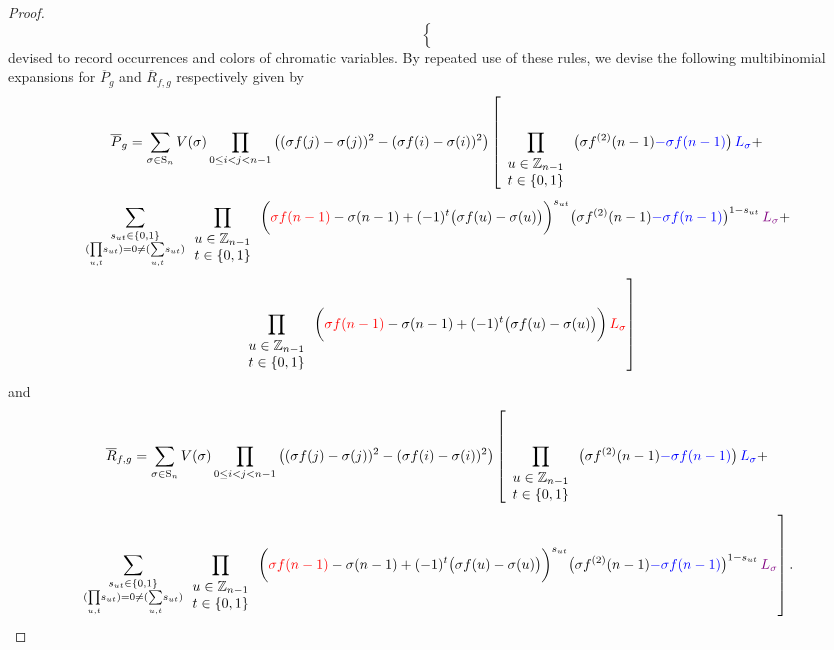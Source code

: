 \begin{proof}
\[\begin{cases}
\begin{array}{ccc}
\end{array}\end{cases}
\]
devised to record occurrences and colors of chromatic variables. By repeated use of these rules, we devise the following multibinomial expansions for $\overline{P}_{g}$ and $\overline{R}_{f,g}$ respectively given by
\[
\overline{P}_{g}=\sum_{\sigma\in\text{S}_{n}}V(\sigma)\prod_{0\le i<j<n-1}\big((\sigma f(j)-\sigma(j))^{2}-(\sigma f(i)-\sigma(i))^{2}\big)\left[\prod_{\begin{array}{c}
u\in\mathbb{Z}_{n-1}\\
t\in\{0,1\}
\end{array}}\big(\sigma f^{(2)}(n-1){\color{blue}-\sigma f(n-1)}\big)\,{\color{blue}L_{\sigma}}+\right.
\]
\[
\sum_{\substack{s_{ut}\in\{0,1\}\\
(\underset{u,t}{\prod}s_{ut})=0\ne(\underset{u,t}{\sum}s_{ut})
}
}\prod_{\begin{array}{c}
u\in\mathbb{Z}_{n-1}\\
t\in\{0,1\}
\end{array}}\bigg({\color{red}\sigma f(n-1)}-\sigma(n-1)+(-1)^{t}\big(\sigma f(u)-\sigma(u)\big)\bigg)^{s_{ut}}\big(\sigma f^{(2)}(n-1){\color{blue}-\sigma f(n-1)}\big)^{1-s_{ut}}\,{\color{violet}L_{\sigma}}+
\]
\[
\left.\prod_{\begin{array}{c}
u\in\mathbb{Z}_{n-1}\\
t\in\{0,1\}
\end{array}}\bigg({\color{red}\sigma f(n-1)}-\sigma(n-1)+(-1)^{t}\big(\sigma f(u)-\sigma(u)\big)\bigg)\,{\color{red}L_{\sigma}}\right]
\]
and
\[
\overline{R}_{f,g}=\sum_{\sigma\in\text{S}_{n}}V(\sigma)\prod_{0\le i<j<n-1}\big((\sigma f(j)-\sigma(j))^{2}-(\sigma f(i)-\sigma(i))^{2}\big)\left[\prod_{\begin{array}{c}
u\in\mathbb{Z}_{n-1}\\
t\in\{0,1\}
\end{array}}\big(\sigma f^{(2)}(n-1){\color{blue}-\sigma f(n-1)}\big)\,{\color{blue}L_{\sigma}}+\right.
\]
\[
\left.\sum_{\substack{s_{ut}\in\{0,1\}\\
(\underset{u,t}{\prod}s_{ut})=0\ne(\underset{u,t}{\sum}s_{ut})
}
}\prod_{\begin{array}{c}
u\in\mathbb{Z}_{n-1}\\
t\in\{0,1\}
\end{array}}\bigg({\color{red}\sigma f(n-1)}-\sigma(n-1)+(-1)^{t}\big(\sigma f(u)-\sigma(u)\big)\bigg)^{s_{ut}}\big(\sigma f^{(2)}(n-1){\color{blue}-\sigma f(n-1)}\big)^{1-s_{ut}}\,{\color{violet}L_{\sigma}}\right].
\]
\end{proof}
